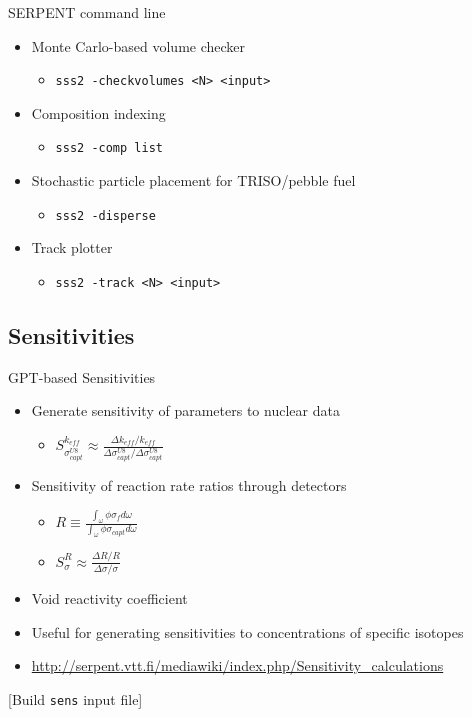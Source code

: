 \documentclass{beamer}
\newcommand{\examplefile}[1]{\centerline{[Build \texttt{#1} input file]}}
\begin{document}
\begin{frame}{SERPENT command line}
    \begin{itemize}
        \item Monte Carlo-based volume checker
        \begin{itemize}
            \item{\texttt{sss2 -checkvolumes <N> <input>}}
        \end{itemize}
        \item Composition indexing
        \begin{itemize}
            \item{\texttt{sss2 -comp list}}
        \end{itemize}
        \item Stochastic particle placement for TRISO/pebble fuel
        \begin{itemize}
            \item{\texttt{sss2 -disperse}}
        \end{itemize}
        \item Track plotter
        \begin{itemize}
            \item{\texttt{sss2 -track <N> <input>}}
        \end{itemize}
    \end{itemize}
\end{frame}

\subsection{Sensitivities}

\begin{frame}{GPT-based Sensitivities}
    \begin{itemize}
        \item Generate sensitivity of parameters to nuclear data
        \begin{itemize}
            \item $S^{k_{eff}}_{\sigma_{capt}^{U8}}\approx
                \frac{\Delta k_{eff}/k_{eff}}{\Delta\sigma^{U8}_{capt} / \Delta\sigma^{U8}_{capt}}$
        \end{itemize}
        \item Sensitivity of reaction rate ratios through detectors
        \begin{itemize}
            \item $R\equiv \frac{\int_\omega\phi\sigma_fd\omega}{\int_\omega\phi\sigma_{capt}d\omega}$
            \item $S^R_\sigma\approx\frac{\Delta R/R}{\Delta\sigma /\sigma}$
        \end{itemize}
    \item Void reactivity coefficient
    \item Useful for generating sensitivities to concentrations of specific isotopes
    \item \url{http://serpent.vtt.fi/mediawiki/index.php/Sensitivity\_calculations}
    \end{itemize}
    \examplefile{sens}
\end{frame}
\end{document}
